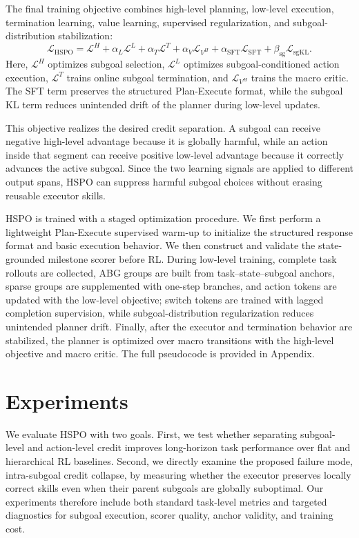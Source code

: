 \documentclass{article}
\newcommand{\wei}[1]{\textcolor{red}{#1}}
\begin{document}
The final training objective combines high-level planning, low-level execution, termination learning, value learning, supervised regularization, and subgoal-distribution stabilization:
\begin{equation}
\mathcal{L}_{\mathrm{HSPO}}
=
\mathcal{L}^{H}
+
\alpha_L \mathcal{L}^{L}
+
\alpha_T \mathcal{L}^{T}
+
\alpha_V \mathcal{L}_{V^H}
+
\alpha_{\mathrm{SFT}}\mathcal{L}_{\mathrm{SFT}}
+
\beta_{\mathrm{sg}}\mathcal{L}_{\mathrm{sgKL}}.
\label{eq:total_loss}
\end{equation}
Here, $\mathcal{L}^{H}$ optimizes subgoal selection, $\mathcal{L}^{L}$ optimizes subgoal-conditioned action execution, $\mathcal{L}^{T}$ trains online subgoal termination, and $\mathcal{L}_{V^H}$ trains the macro critic. The SFT term preserves the structured Plan-Execute format, while the subgoal KL term reduces unintended drift of the planner during low-level updates.

This objective realizes the desired credit separation. A subgoal can receive negative high-level advantage because it is globally harmful, while an action inside that segment can receive positive low-level advantage because it correctly advances the active subgoal. Since the two learning signals are applied to different output spans, HSPO can suppress harmful subgoal choices without erasing reusable executor skills.

HSPO is trained with a staged optimization procedure. We first perform a lightweight Plan-Execute supervised warm-up to initialize the structured response format and basic execution behavior. We then construct and validate the state-grounded milestone scorer before RL. During low-level training, complete task rollouts are collected, ABG groups are built from task--state--subgoal anchors, sparse groups are supplemented with one-step branches, and action tokens are updated with the low-level objective; switch tokens are trained with lagged completion supervision, while subgoal-distribution regularization reduces unintended planner drift. Finally, after the executor and termination behavior are stabilized, the planner is optimized over macro transitions with the high-level objective and macro critic. The full pseudocode is provided in Appendix.



\section{Experiments}
\label{sec:experiments}
We evaluate HSPO with two goals. First, we test whether separating subgoal-level and action-level credit improves long-horizon task performance over flat and hierarchical RL baselines. Second, we directly examine the proposed failure mode, intra-subgoal credit collapse, by measuring whether the executor preserves locally correct skills even when their parent subgoals are globally suboptimal. Our experiments therefore include both standard task-level metrics and targeted diagnostics for subgoal execution, scorer quality, anchor validity, and training cost.
\end{document}
